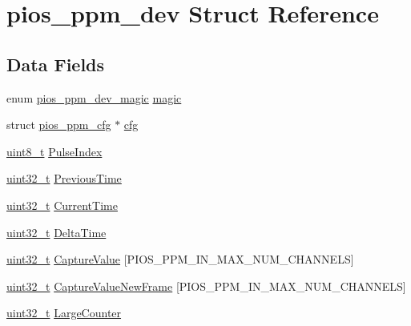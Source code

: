 \hypertarget{structpios__ppm__dev}{\section{pios\-\_\-ppm\-\_\-dev Struct Reference}
\label{structpios__ppm__dev}
}
\subsection*{Data Fields}
\begin{DoxyCompactItemize}
\item 
enum \hyperlink{group___p_i_o_s___p_p_m_ga6d320e57fe875e76b2fa71a688f865aa}{pios\-\_\-ppm\-\_\-dev\-\_\-magic} \hyperlink{structpios__ppm__dev_a1e45b2498e0e64e13001774d17d95417}{magic}
\item 
struct \hyperlink{structpios__ppm__cfg}{pios\-\_\-ppm\-\_\-cfg} $\ast$ \hyperlink{structpios__ppm__dev_a570855666b2b9414a8e77ad4058649ce}{cfg}
\item 
\hyperlink{stdint_8h_aba7bc1797add20fe3efdf37ced1182c5}{uint8\-\_\-t} \hyperlink{structpios__ppm__dev_a86d68429cfa42b6688d6bc4c307de08e}{Pulse\-Index}
\item 
\hyperlink{stdint_8h_a435d1572bf3f880d55459d9805097f62}{uint32\-\_\-t} \hyperlink{structpios__ppm__dev_acdc4c4f35b3ab795bcf29ecc9a3f4b45}{Previous\-Time}
\item 
\hyperlink{stdint_8h_a435d1572bf3f880d55459d9805097f62}{uint32\-\_\-t} \hyperlink{structpios__ppm__dev_a789b591ce1dee1c69df37405c130cd91}{Current\-Time}
\item 
\hyperlink{stdint_8h_a435d1572bf3f880d55459d9805097f62}{uint32\-\_\-t} \hyperlink{structpios__ppm__dev_a551519de53d5ad750d8e360f4fcacd53}{Delta\-Time}
\item 
\hyperlink{stdint_8h_a435d1572bf3f880d55459d9805097f62}{uint32\-\_\-t} \hyperlink{structpios__ppm__dev_af78c364c08454847be99632c8a2f4bdf}{Capture\-Value} \mbox{[}P\-I\-O\-S\-\_\-\-P\-P\-M\-\_\-\-I\-N\-\_\-\-M\-A\-X\-\_\-\-N\-U\-M\-\_\-\-C\-H\-A\-N\-N\-E\-L\-S\mbox{]}
\item 
\hyperlink{stdint_8h_a435d1572bf3f880d55459d9805097f62}{uint32\-\_\-t} \hyperlink{structpios__ppm__dev_a5fee214f001bdd57610a6db6573fbd7d}{Capture\-Value\-New\-Frame} \mbox{[}P\-I\-O\-S\-\_\-\-P\-P\-M\-\_\-\-I\-N\-\_\-\-M\-A\-X\-\_\-\-N\-U\-M\-\_\-\-C\-H\-A\-N\-N\-E\-L\-S\mbox{]}
\item 
\hyperlink{stdint_8h_a435d1572bf3f880d55459d9805097f62}{uint32\-\_\-t} \hyperlink{structpios__ppm__dev_ac18ce6183b9943ec4bae05ec82c8b595}{Large\-Counter}

\end{DoxyCompactItemize}
